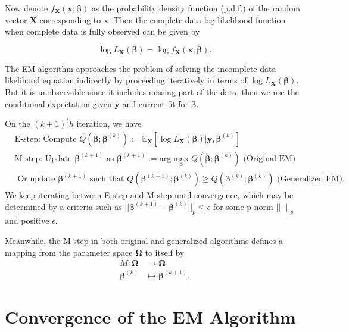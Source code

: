 \documentclass[
  a4paper,
  oneside,
  openany,
  12pt,
  onecolumn]{book}
\theoremstyle{plain}
\theoremstyle{remark}
\begin{document}
Now denote \(f_\boldsymbol{X}(\boldsymbol{x};\boldsymbol{\beta})\) as
the probability density function (p.d.f.) of the random vector
\(\boldsymbol{X}\) corresponding to \(\boldsymbol{x}\). Then the
complete-data log-likelihood function when complete data is fully
observed can be given by

\[\log L_\boldsymbol{X}(\boldsymbol{\beta})=\log f_\boldsymbol{X}(\boldsymbol{x};\boldsymbol{\beta}).\]

The EM algorithm approaches the problem of solving the incomplete-data
likelihood equation indirectly by proceeding iteratively in terms of
\(\log L_\boldsymbol{X}(\boldsymbol{\beta})\). But it is unobservable
since it includes missing part of the data, then we use the conditional
expectation given \(\boldsymbol{y}\) and current fit for
\(\boldsymbol{\beta}\).

On the \((k+1)^th\) iteration, we have \[
\begin{align*}
&\text{E-step: Compute } Q(\boldsymbol{\beta};\boldsymbol{\beta}^{(k)}):=\mathbb{E}_\boldsymbol{X}[\log L_\boldsymbol{X}(\boldsymbol{\beta})|\boldsymbol{y},\boldsymbol{\beta}^{(k)}]\\
&\text{M-step: Update }\boldsymbol{\beta}^{(k+1)} \text{ as }\boldsymbol{{\beta}}^{(k+1)}:=\text{arg}\max_\boldsymbol{\beta} Q(\boldsymbol{\beta};\boldsymbol{\beta}^{(k)}) \text{ (Original EM)}\\
& \text{ Or update }\boldsymbol{{\beta}}^{(k+1)} \text{ such that } Q(\boldsymbol{\beta}^{(k+1)};\boldsymbol{\beta}^{(k)})\geq Q(\boldsymbol{\beta}^{(k)};\boldsymbol{\beta}^{(k)})\text{ (Generalized EM)}.
\end{align*} 
\] We keep iterating between E-step and M-step until convergence, which
may be determined by a criteria such as
\(||\boldsymbol{\beta}^{(k+1)}-\boldsymbol{\beta}^{(k)}||_p\leq \epsilon\)
for some p-norm \(||\cdot||_p\) and positive \(\epsilon\).

Meanwhile, the M-step in both original and generalized algorithms
defines a mapping from the parameter space \(\boldsymbol{\Omega}\) to
itself by \[
\begin{align*}
M: \boldsymbol{\Omega} &\to \boldsymbol{\Omega}\\
   \boldsymbol{\beta}^{(k)} &\mapsto \boldsymbol{\beta}^{(k+1)}.
\end{align*}
\]

\section{Convergence of the EM
Algorithm}\label{convergence-of-the-em-algorithm}
\end{document}
